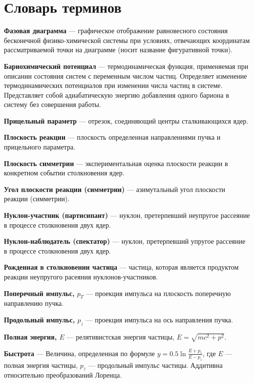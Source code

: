 \chapter*{Словарь терминов}             %

\textbf{Фазовая диаграмма} --- графическое отображение равновесного состояния бесконечной физико-химической системы при условиях, отвечающих координатам рассматриваемой точки на диаграмме (носит название фигуративной точки).

\textbf{Бариохимический потенциал} ---  термодинамическая функция, применяемая при описании состояния систем с переменным числом частиц. 
Определяет изменение термодинамических потенциалов при изменении числа частиц в системе. 
Представляет собой адиабатическую энергию добавления одного бариона в систему без совершения работы.

\textbf{Прицельный параметр} --- отрезок, соединяющий центры сталкивающихся ядер.

\textbf{Плоскость реакции} --- плоскость определенная направлениями пучка и прицельного параметра.

\textbf{Плоскость симметрии} --- экспериментальная оценка плоскости реакции в конкретном событии столкновения ядер.

\textbf{Угол плоскости реакции (симметрии)} --- азимутальный угол плоскости реакции (симметрии).

\textbf{Нуклон-участник (партисипант)} --- нуклон, претерпевший неупругое рассеяние в процессе столкновения двух ядер.

\textbf{Нуклон-наблюдатель (спектатор)} --- нуклон, претерпевший упругое рассеяние в процессе столкновения двух ядер.

\textbf{Рожденная в столкновении частица} --- частица, которая является продуктом реакции неупругого расеяния нуклонов-участников.

\textbf{Поперечный импульс, $p_T$} --- проекция импульса на плоскость поперечную направлению пучка.

\textbf{Продольный импульс, $p_z$} --- проекция импульса на ось направления пучка.

\textbf{Полная энергия, $E$} --- релятивистская энергия частицы, $E = \sqrt{mc^2 + p^2}$.

\textbf{Быстрота} --- Величина, определенная по формуле $y = 0.5\ln \frac{ E + p_z }{ E - p_z }$, где $E$ --- полная энергия частицы, $p_z$ --- продольный импульс частицы.
Аддитивна относительно преобразований Лоренца.

